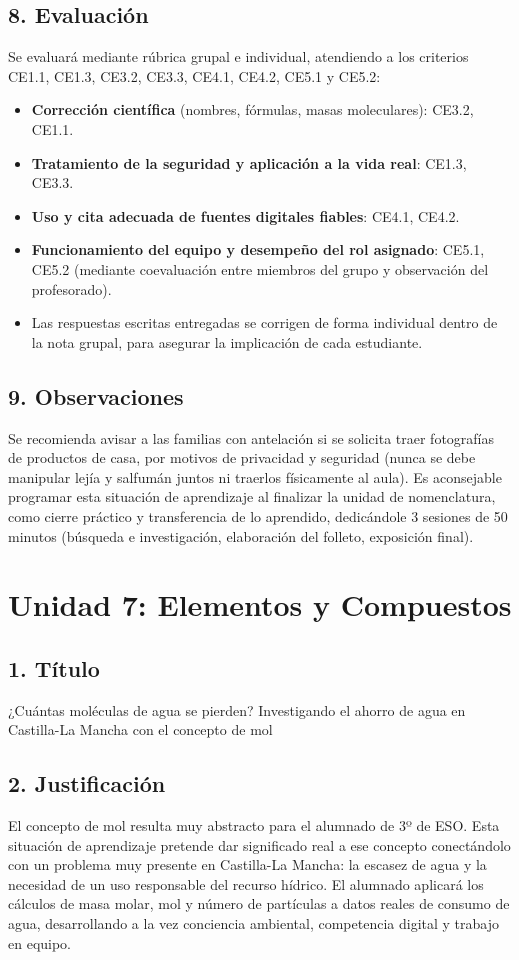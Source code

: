 \documentclass[11pt,a4paper]{article}
\begin{document}
\subsection*{8. Evaluación}
Se evaluará mediante rúbrica grupal e individual, atendiendo a los criterios CE1.1, CE1.3, CE3.2, CE3.3, CE4.1, CE4.2, CE5.1 y CE5.2:
\begin{itemize}
    \item \textbf{Corrección científica} (nombres, fórmulas, masas moleculares): CE3.2, CE1.1.
    \item \textbf{Tratamiento de la seguridad y aplicación a la vida real}: CE1.3, CE3.3.
    \item \textbf{Uso y cita adecuada de fuentes digitales fiables}: CE4.1, CE4.2.
    \item \textbf{Funcionamiento del equipo y desempeño del rol asignado}: CE5.1, CE5.2 (mediante coevaluación entre miembros del grupo y observación del profesorado).
    \item Las respuestas escritas entregadas se corrigen de forma individual dentro de la nota grupal, para asegurar la implicación de cada estudiante.
\end{itemize}

\subsection*{9. Observaciones}
Se recomienda avisar a las familias con antelación si se solicita traer fotografías de productos de casa, por motivos de privacidad y seguridad (nunca se debe manipular lejía y salfumán juntos ni traerlos físicamente al aula). Es aconsejable programar esta situación de aprendizaje al finalizar la unidad de nomenclatura, como cierre práctico y transferencia de lo aprendido, dedicándole 3 sesiones de 50 minutos (búsqueda e investigación, elaboración del folleto, exposición final).

\newpage
\section{Unidad 7: Elementos y Compuestos}
\subsection*{1. Título}
¿Cuántas moléculas de agua se pierden? Investigando el ahorro de agua en Castilla-La Mancha con el concepto de mol

\subsection*{2. Justificación}
El concepto de mol resulta muy abstracto para el alumnado de 3º de ESO. Esta situación de aprendizaje pretende dar significado real a ese concepto conectándolo con un problema muy presente en Castilla-La Mancha: la escasez de agua y la necesidad de un uso responsable del recurso hídrico. El alumnado aplicará los cálculos de masa molar, mol y número de partículas a datos reales de consumo de agua, desarrollando a la vez conciencia ambiental, competencia digital y trabajo en equipo.
\end{document}
